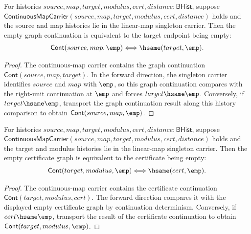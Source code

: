 \begin{theorem}
\label{thm:funcobj-linear-singleton-continuous-map-target-graph-empty-iff}
For histories $source,map,target,modulus,cert,distance:\mathsf{BHist}$,
suppose
$\mathsf{ContinuousMapCarrier}(source,map,target,modulus,cert,distance)$ holds
and the source and map histories lie in the linear-map singleton carrier. Then
the empty graph continuation is equivalent to the target endpoint being empty:
$$
\mathsf{Cont}(source,map,\emp)\Longleftrightarrow\hsame(target,\emp).
$$
\end{theorem}
\begin{proof}
The continuous-map carrier contains the graph continuation
$\mathsf{Cont}(source,map,target)$. In the forward direction, the singleton
carrier identifies $source$ and $map$ with $\emp$, so this graph continuation
compares with the right-unit continuation at $\emp$ and forces
$target\hsame\emp$. Conversely, if $target\hsame\emp$, transport the graph
continuation result along this history comparison to obtain
$\mathsf{Cont}(source,map,\emp)$.
\end{proof}

\begin{theorem}
\label{thm:funcobj-linear-singleton-continuous-map-cert-graph-empty-iff}
For histories $source,map,target,modulus,cert,distance:\mathsf{BHist}$,
suppose
$\mathsf{ContinuousMapCarrier}(source,map,target,modulus,cert,distance)$ holds
and the target and modulus histories lie in the linear-map singleton carrier.
Then the empty certificate graph is equivalent to the certificate being empty:
$$
\mathsf{Cont}(target,modulus,\emp)\Longleftrightarrow\hsame(cert,\emp).
$$
\end{theorem}
\begin{proof}
The continuous-map carrier contains the certificate continuation
$\mathsf{Cont}(target,modulus,cert)$. The forward direction compares it with
the displayed empty certificate graph by continuation determinism. Conversely,
if $cert\hsame\emp$, transport the result of the certificate continuation to
obtain $\mathsf{Cont}(target,modulus,\emp)$.
\end{proof}

